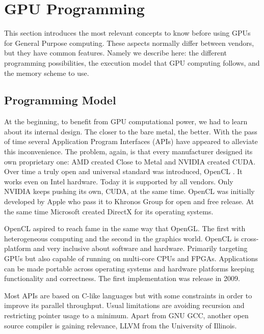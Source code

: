 \documentclass{article}
\begin{document}
\section{GPU Programming}
\label{sec:programming}

This section introduces the most relevant concepts to know before using GPUs for General Purpose computing. These aspects normally differ between vendors, but they have common features. Namely we describe here: the different programming possibilities, the execution model that GPU computing follows, and the memory scheme to use.

\subsection{Programming Model}

At the beginning, to benefit from GPU computational power, we had to learn about its internal design. The closer to the bare metal, the better. With the pass of time several Application Program Interfaces (APIs) have appeared to alleviate this inconvenience. The problem, again, is that every manufacturer designed its own proprietary one: AMD created Close to Metal and NVIDIA created CUDA. Over time a truly open and universal standard was introduced, OpenCL \cite{opencl}. It works even on Intel hardware. Today it is supported by all vendors. Only NVIDIA keeps pushing its own, CUDA, at the same time. OpenCL was initially developed by Apple who pass it to Khronos Group for open and free release. At the same time Microsoft created DirectX for its operating systems.

OpenCL aspired to reach fame in the same way that OpenGL. The first with heterogeneous computing and the second in the graphics world. OpenCL is cross-platform and very inclusive about software and hardware. Primarily targeting GPUs but also capable of running on multi-core CPUs and FPGAs. Applications can be made portable across operating systems and hardware platforms keeping functionality and correctness. The first implementation was release in 2009.

Most APIs are based on C-like languages but with some constraints in order to improve its parallel throughput. Usual limitations are avoiding recursion and restricting pointer usage to a minimum. Apart from GNU GCC, another open source compiler is gaining relevance, LLVM \cite{LLVM} from the University of Illinois.
\end{document}
